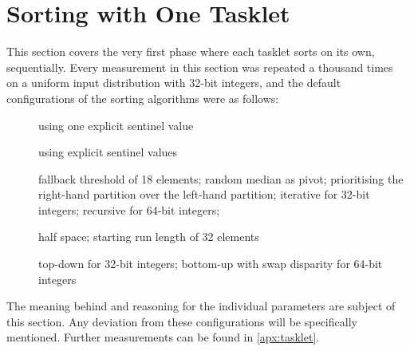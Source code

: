 \section{Sorting with One Tasklet}

This section covers the very first phase where each tasklet sorts on its own, \ie{} sequentially.
Every measurement in this section was repeated a thousand times on a uniform input distribution with 32-bit integers, and the default configurations of the sorting algorithms were as follows:
\begin{description}
	\item[\IS{}]
	using one explicit sentinel value

	\item[\ShS{}]
	using explicit sentinel values

	\item[\QS{}]
	fallback threshold of 18 elements;
	random median as pivot;
	prioritising the right-hand partition over the left-hand partition;
	iterative for 32-bit integers;
	recursive for 64-bit integers;

	\item[\MS{}]
	half space;
	starting run length of 32 elements

	\item[\HS{}]
	top-down for 32-bit integers;
	bottom-up with swap disparity for 64-bit integers
\end{description}
The meaning behind and reasoning for the individual parameters are subject of this section.
Any deviation from these configurations will be specifically mentioned.
Further measurements can be found in \cref{apx:tasklet}.






